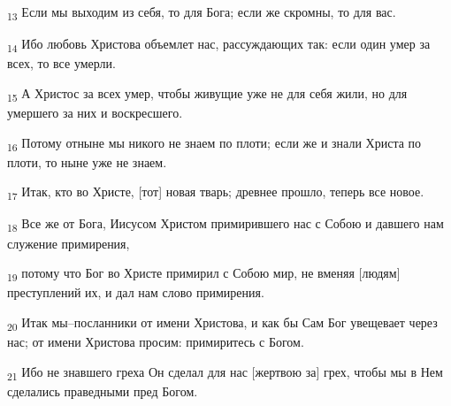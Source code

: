 \begin{tcolorbox}
\textsubscript{13} Если мы выходим из себя, то для Бога; если же скромны, то для вас.
\end{tcolorbox}
\begin{tcolorbox}
\textsubscript{14} Ибо любовь Христова объемлет нас, рассуждающих так: если один умер за всех, то все умерли.
\end{tcolorbox}
\begin{tcolorbox}
\textsubscript{15} А Христос за всех умер, чтобы живущие уже не для себя жили, но для умершего за них и воскресшего.
\end{tcolorbox}
\begin{tcolorbox}
\textsubscript{16} Потому отныне мы никого не знаем по плоти; если же и знали Христа по плоти, то ныне уже не знаем.
\end{tcolorbox}
\begin{tcolorbox}
\textsubscript{17} Итак, кто во Христе, [тот] новая тварь; древнее прошло, теперь все новое.
\end{tcolorbox}
\begin{tcolorbox}
\textsubscript{18} Все же от Бога, Иисусом Христом примирившего нас с Собою и давшего нам служение примирения,
\end{tcolorbox}
\begin{tcolorbox}
\textsubscript{19} потому что Бог во Христе примирил с Собою мир, не вменяя [людям] преступлений их, и дал нам слово примирения.
\end{tcolorbox}
\begin{tcolorbox}
\textsubscript{20} Итак мы--посланники от имени Христова, и как бы Сам Бог увещевает через нас; от имени Христова просим: примиритесь с Богом.
\end{tcolorbox}
\begin{tcolorbox}
\textsubscript{21} Ибо не знавшего греха Он сделал для нас [жертвою за] грех, чтобы мы в Нем сделались праведными пред Богом.
\end{tcolorbox}
